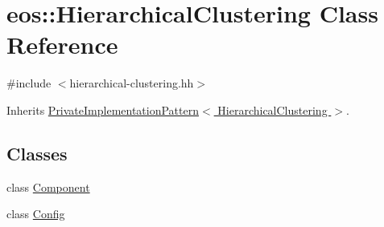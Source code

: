 \hypertarget{classeos_1_1HierarchicalClustering}{
\section{eos::HierarchicalClustering Class Reference}
\label{classeos_1_1HierarchicalClustering}
}


{\ttfamily \#include $<$hierarchical-\/clustering.hh$>$}

Inherits \hyperlink{classeos_1_1PrivateImplementationPattern}{PrivateImplementationPattern$<$ HierarchicalClustering $>$}.\subsection*{Classes}
\begin{DoxyCompactItemize}
\item 
class \hyperlink{classeos_1_1HierarchicalClustering_1_1Component}{Component}
\item 
class \hyperlink{classeos_1_1HierarchicalClustering_1_1Config}{Config}
\end{DoxyCompactItemize}
